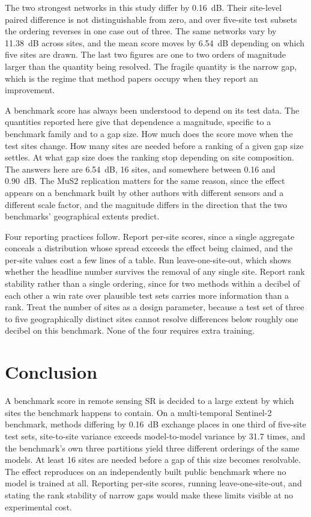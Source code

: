 \documentclass[journal]{IEEEtran}
\begin{document}
The two strongest networks in this study differ by 0.16~dB. Their site-level paired
difference is not distinguishable from zero, and over five-site test subsets the
ordering reverses in one case out of three. The same networks vary by 11.38~dB
across sites, and the mean score moves by 6.54~dB depending on which five sites are
drawn. The last two figures are one to two orders of magnitude larger than the
quantity being resolved. The fragile quantity is the narrow gap, which is the
regime that method papers occupy when they report an improvement.

A benchmark score has always been understood to depend on its test data. The
quantities reported here give that dependence a magnitude, specific to a benchmark
family and to a gap size. How much does the score move when the test sites change.
How many sites are needed before a ranking of a given gap size settles. At what gap
size does the ranking stop depending on site composition. The answers here are
6.54~dB, 16 sites, and somewhere between 0.16 and 0.90~dB. The MuS2 replication
matters for the same reason, since the effect appears on a benchmark built by other
authors with different sensors and a different scale factor, and the magnitude
differs in the direction that the two benchmarks' geographical extents predict.

Four reporting practices follow. Report per-site scores, since a single aggregate
conceals a distribution whose spread exceeds the effect being claimed, and the
per-site values cost a few lines of a table. Run leave-one-site-out, which shows
whether the headline number survives the removal of any single site. Report rank
stability rather than a single ordering, since for two methods within a decibel of
each other a win rate over plausible test sets carries more information than a
rank. Treat the number of sites as a design parameter, because a test set of three
to five geographically distinct sites cannot resolve differences below roughly one
decibel on this benchmark. None of the four requires extra training.

\section{Conclusion}

A benchmark score in remote sensing SR is decided to a large extent by which sites
the benchmark happens to contain. On a multi-temporal Sentinel-2 benchmark, methods
differing by 0.16~dB exchange places in one third of five-site test sets,
site-to-site variance exceeds model-to-model variance by 31.7 times, and the
benchmark's own three partitions yield three different orderings of the same
models. At least 16 sites are needed before a gap of this size becomes resolvable.
The effect reproduces on an independently built public benchmark where no model is
trained at all. Reporting per-site scores, running leave-one-site-out, and stating
the rank stability of narrow gaps would make these limits visible at no
experimental cost.
\end{document}
